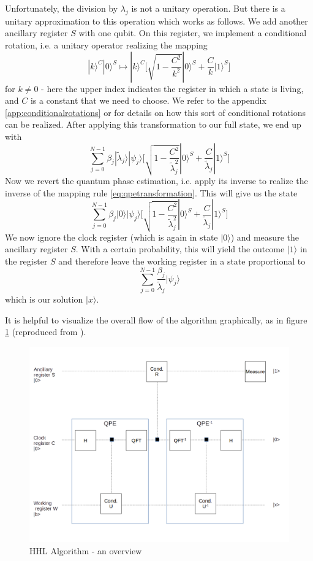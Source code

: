 \documentclass[a4paper, draft]{article}
\theoremstyle{own}
\theoremstyle{remark}
\begin{document}
Unfortunately, the division by $\lambda_j$ is not a unitary operation. But there is a unitary approximation to this operation which works as follows. We add another ancillary register $S$ with one qubit. On this register, we implement a conditional rotation, i.e. a unitary operator realizing the mapping
$$
|k \rangle^C |0 \rangle^S \mapsto |k \rangle^C \big[  \sqrt{1 - \frac{C^2}{k^2}}  |0 \rangle^S + \frac{C}{k} |1 \rangle^S   \big] 
$$
for $k \neq 0$ - here the upper index indicates the register in which a state is living, and $C$ is a constant that we need to choose. We refer to the appendix \ref{app:conditionalrotations} or \cite{Poisson} for details on how this sort of conditional rotations can be realized. After applying this transformation to our full state, we end up with
$$
\sum_{j=0}^{N-1} \beta_j |\tilde{\lambda}_j \rangle |\psi_j \rangle \big[  \sqrt{1 - \frac{C^2}{\tilde{\lambda}_j^2}}  |0 \rangle^S + \frac{C}{\tilde{\lambda}_j} |1 \rangle^S   \big] 
$$
Now we revert the quantum phase estimation, i.e. apply its inverse to realize the inverse of the mapping rule \eqref{eq:qpetransformation}. This will give us the state
$$
\sum_{j=0}^{N-1} \beta_j |0\rangle |\psi_j \rangle \big[  \sqrt{1 - \frac{C^2}{\tilde{\lambda}_j^2}}  |0 \rangle^S + \frac{C}{\tilde{\lambda}_j} |1 \rangle^S   \big] 
$$
We now ignore the clock register (which is again in state $|0 \rangle$) and measure the ancillary register $S$. With a certain probability, this will yield the outcome $|1\rangle$ in the register $S$ and therefore leave the working register in a state proportional to
$$
\sum_{j=0}^{N-1} \frac{\beta_j}{\tilde{\lambda}_j}  |\psi_j \rangle     
$$
which is our solution $|x \rangle$. 

It is helpful to visualize the overall flow of the algorithm graphically, as in figure \ref{fig:HHLOverview} (reproduced from \cite{HHLPrimer}).


\begin{figure}
\centering
\includegraphics[width=0.7\linewidth]{images/HHLOverview}
\caption[HHL Algorithm - an overview]{HHL Algorithm - an overview}
\label{fig:HHLOverview}
\end{figure}
\end{document}
